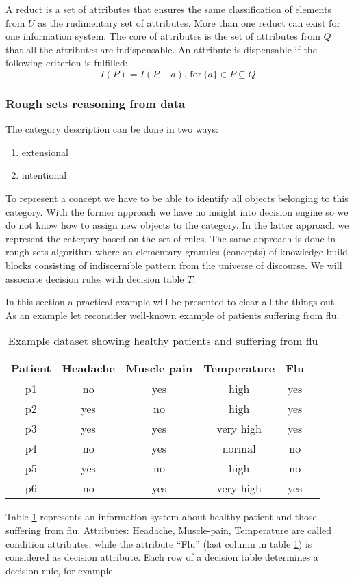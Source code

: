 A reduct is a set of attributes that ensures the same classification of
elements from $U$ as the rudimentary set of attributes. More than one reduct
can exist for one information system. The core of attributes is the set of
attributes from $Q$ that all the attributes are indispensable. An attribute is
dispensable if the following criterion is fulfilled:
$$I(P) = I(P-{a}), \, \textrm{for} \, \{a\} \in P \subseteq  Q $$

\subsubsection{Rough sets reasoning from data}
The category description can be done in two ways:
\begin{enumerate}
    \item extensional
    \item intentional
\end{enumerate}
To represent a concept we have to be able to identify all objects belonging 
to this category. With the former approach we have no insight 
into decision engine so we do not know how to assign new objects to the category.
In the latter approach we represent the category based on the set of rules. The same 
approach is done in rough sets algorithm where an elementary 
granules (concepts) of knowledge build blocks consisting 
of indiscernible pattern from the universe of discourse. 
We will associate decision rules with decision table $T$.

In this section a practical example will be presented to clear all the things
out. As an example let reconsider well-known example of patients suffering from
flu. 
\begin{table}[H]
    \centering
    \caption{Example dataset showing healthy patients and suffering from flu}
    \begin{tabular}{|c|c|c|c|c|c|}
        \hline 
    Patient & Headache & Muscle pain & Temperature & Flu \\ \hline \hline
    p1 & no & yes & high & yes \\ \hline
    p2 & yes & no & high & yes \\ \hline
    p3 & yes & yes & very high & yes \\ \hline
    p4 & no & yes & normal & no \\ \hline
    p5 & yes & no & high & no \\ \hline
    p6 & no & yes & very high & yes \\ \hline    
    \end{tabular}
    \label{tab:example_rough_set}
\end{table}
Table \ref{tab:example_rough_set} represents an information system about
healthy patient and those suffering from flu. Attributes: Headache,
Muscle-pain, Temperature are called condition attributes, while the attribute
``Flu'' (last column in table \ref{tab:example_rough_set}) is considered as
decision attribute. Each row of a decision table determines a decision rule,
for example

